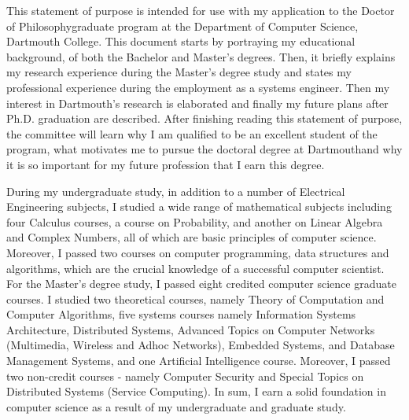 \documentclass[a4paper,10pt]{report}
\newcommand{\university}{Dartmouth College}
\newcommand{\department}{Department of Computer Science}
\newcommand{\uniabbre}{Dartmouth}
\newcommand{\degree}{Doctor of Philosophy}
\begin{document}

\vspace{0.4cm}
This statement of purpose is intended for use with my application to the \degree \space graduate program at the \department, \university. This document starts by portraying my educational background, of both the Bachelor and Master's degrees. Then, it briefly explains my research experience during the Master's degree study and states my professional experience during the employment as a systems engineer. Then my interest in \uniabbre's research is elaborated and finally my future plans after Ph.D. graduation are described. After finishing reading this statement of purpose, the committee will learn why I am qualified to be an excellent student of the program, what motivates me to pursue the doctoral degree at \uniabbre \space and why it is so important for my future profession that I earn this degree.

\vspace{0.2cm}
During my undergraduate study, in addition to a number of Electrical Engineering subjects, I studied a wide range of mathematical subjects including four Calculus courses, a course on Probability, and another on Linear Algebra and Complex Numbers, all of which are basic principles of computer science. Moreover, I passed two courses on computer programming, data structures and algorithms, which are the crucial knowledge of a successful computer scientist. For the Master's degree study, I passed eight credited computer science graduate courses. I studied two theoretical courses, namely Theory of Computation and Computer Algorithms, five systems courses namely Information Systems Architecture, Distributed Systems, Advanced Topics on Computer Networks (Multimedia, Wireless and Adhoc Networks), Embedded Systems, and Database Management Systems, and one Artificial Intelligence course. Moreover, I passed two non-credit courses - namely Computer Security and Special Topics on Distributed Systems (Service Computing). In sum, I earn a solid foundation in computer science as a result of my undergraduate and graduate study. 
\end{document}
